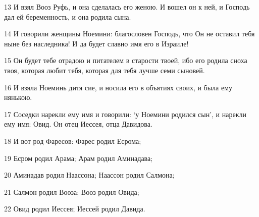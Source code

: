 \par 13 И взял Вооз Руфь, и она сделалась его женою. И вошел он к ней, и Господь дал ей беременность, и она родила сына.
\par 14 И говорили женщины Ноемини: благословен Господь, что Он не оставил тебя ныне без наследника! И да будет славно имя его в Израиле!
\par 15 Он будет тебе отрадою и питателем в старости твоей, ибо его родила сноха твоя, которая любит тебя, которая для тебя лучше семи сыновей.
\par 16 И взяла Ноеминь дитя сие, и носила его в объятиях своих, и была ему нянькою.
\par 17 Соседки нарекли ему имя и говорили: `у Ноемини родился сын', и нарекли ему имя: Овид. Он отец Иессея, отца Давидова.
\par 18 И вот род Фаресов: Фарес родил Есрома;
\par 19 Есром родил Арама; Арам родил Аминадава;
\par 20 Аминадав родил Наассона; Наассон родил Салмона;
\par 21 Салмон родил Вооза; Вооз родил Овида;
\par 22 Овид родил Иессея; Иессей родил Давида.


